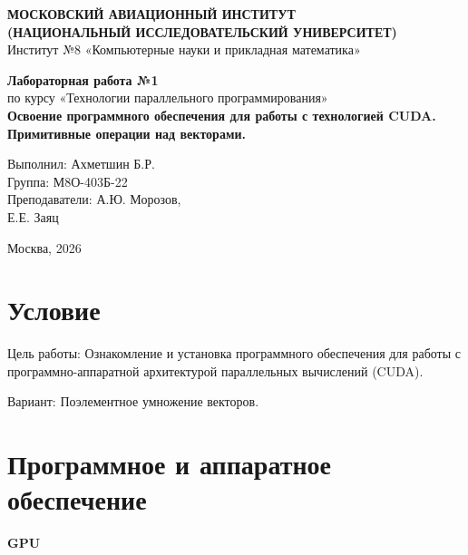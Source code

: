 \documentclass[a4paper,14pt]{extarticle}
\begin{document}
\begin{titlepage}
    \begin{center}
        \textbf{МОСКОВСКИЙ АВИАЦИОННЫЙ ИНСТИТУТ}\\
        \textbf{(НАЦИОНАЛЬНЫЙ ИССЛЕДОВАТЕЛЬСКИЙ УНИВЕРСИТЕТ)}\\
        Институт №8 «Компьютерные науки и прикладная математика»
    \end{center}

    \vspace{3.5cm}

    \begin{center}
        \textbf{\Large Лабораторная работа №1}\\
        \vspace{0.3cm}
        по курсу «Технологии параллельного программирования»\\
        \vspace{0.8cm}
        \textbf{Освоение программного обеспечения для работы с технологией CUDA.}\\
        \textbf{Примитивные операции над векторами.}
    \end{center}

    \vspace{4cm}

    \begin{flushright}
        Выполнил: Ахметшин Б.Р.\\
        Группа: М8О-403Б-22\\
        Преподаватели: А.Ю. Морозов,\\
        \hspace*{3.6cm} Е.Е. Заяц
    \end{flushright}

    \vfill

    \begin{center}
        Москва, 2026
    \end{center}
\end{titlepage}

\section*{Условие}
Цель работы: Ознакомление и установка программного обеспечения для работы с
программно-аппаратной архитектурой параллельных вычислений (CUDA).

Вариант: Поэлементное умножение векторов.

\section*{Программное и аппаратное обеспечение}
\textbf{GPU}
\end{document}
